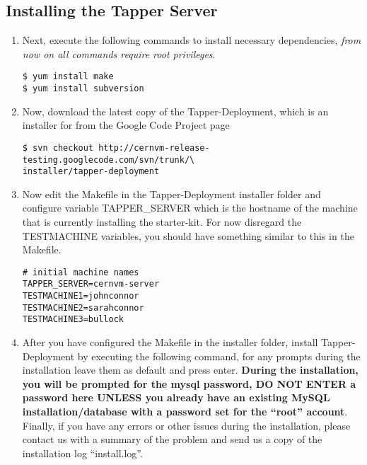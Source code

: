\subsection{Installing the Tapper Server}
\label{installtapserver}
\begin{enumerate}
\item 	Next, execute the following commands to install necessary dependencies, \emph{from now on all commands require root privileges}.

\lstset{language=bash,caption= Install Dependencies}
\begin{lstlisting}
$ yum install make
$ yum install subversion
\end{lstlisting}

\item 	Now, download the latest copy of the Tapper-Deployment, which is an installer for \tapper from the \cernvmreleasetesting 
		Google Code Project page

\lstset{language=bash,caption= Download Tapper-Deployment}
\begin{lstlisting}
$ svn checkout http://cernvm-release-testing.googlecode.com/svn/trunk/\
installer/tapper-deployment
\end{lstlisting}

\item 	Now edit the Makefile in the Tapper-Deployment installer folder and configure variable TAPPER\_SERVER which 
		is the hostname of the machine that is currently installing the starter-kit. For now disregard the TESTMACHINE 
		variables, you should have something similar to this in the Makefile.

\lstset{language=bash,caption= Makefile Configuration}
\begin{lstlisting}
# initial machine names
TAPPER_SERVER=cernvm-server
TESTMACHINE1=johnconnor
TESTMACHINE2=sarahconnor
TESTMACHINE3=bullock
\end{lstlisting}

\item 	After you have configured the Makefile in the installer folder, install Tapper-Deployment by executing the
		following command, for any prompts during the installation leave them as default and press enter. {\bf During
		the installation, you will be prompted for the mysql password, DO NOT ENTER a password here UNLESS you already have an
		existing MySQL installation/database with a password set for the ``root'' account}. Finally, if you have any errors or
		other issues during the installation, please contact us with a summary of the problem and send us a copy of the installation 
		log ``install.log''.


\end{enumerate}
